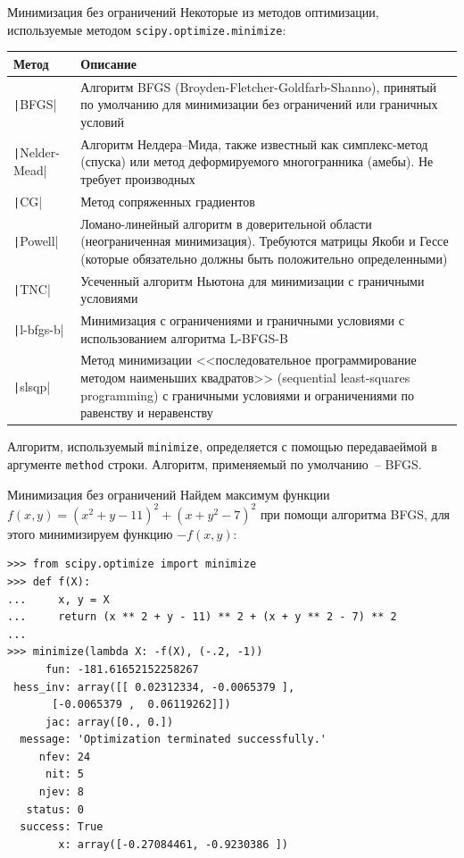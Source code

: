 \documentclass[aspectratio=169, mathserif]{beamer}	%
\begin{document}
\begin{frame}[fragile]{Минимизация без ограничений}
\scriptsize
Некоторые из методов оптимизации, используемые методом \texttt{scipy.optimize.minimize}:
\begin{table}[h!]
\begin{tabular}{|p{}|p{}|}
\hline
\textbf{Метод} & \textbf{Описание} \\
\hline
\texttt|BFGS| & Алгоритм BFGS (Broyden-Fletcher-Goldfarb-Shanno), принятый по умолчанию для минимизации без ограничений или граничных условий \\
\hline
\texttt|Nelder-Mead| & Алгоритм Нелдера–Мида, также известный как симплекс-метод (спуска) или
метод деформируемого многогранника (амебы). Не требует производных \\
\hline
\texttt|CG| & Метод сопряженных градиентов \\
\hline
\texttt|Powell| & Ломано-линейный алгоритм в доверительной области (неограниченная минимизация). Требуются матрицы Якоби и Гессе (которые обязательно должны быть положительно определенными) \\
\hline
\texttt|TNC| & Усеченный алгоритм Ньютона для минимизации с граничными условиями \\
\hline
\texttt|l-bfgs-b| & Минимизация с ограничениями и граничными условиями с использованием алгоритма L-BFGS-B \\
\hline
\texttt|slsqp| & Метод минимизации <<последовательное программирование методом наименьших квадратов>> (sequential least-squares programming) с граничными условиями и ограничениями по равенству и неравенству \\
\hline
\end{tabular}
\end{table}
\vfill
Алгоритм, используемый \texttt{minimize}, определяется с помощью передаваеймой в аргументе \texttt{method} строки. Алгоритм, применяемый по умолчанию~-- BFGS.
\vfill
\end{frame}


\begin{frame}[fragile]{Минимизация без ограничений}
\scriptsize
Найдем максимум функции $f\left(x, y\right) = \left(x^2 + y - 11\right)^2 + \left(x + y^2 - 7\right)^2$ при помощи алгоритма BFGS, для этого минимизируем функцию $-f\left(x, y\right)$:
\vfill
\begin{verbatim}
>>> from scipy.optimize import minimize
>>> def f(X):
...     x, y = X
...     return (x ** 2 + y - 11) ** 2 + (x + y ** 2 - 7) ** 2
...
>>> minimize(lambda X: -f(X), (-.2, -1))
      fun: -181.61652152258267
 hess_inv: array([[ 0.02312334, -0.0065379 ],
       [-0.0065379 ,  0.06119262]])
      jac: array([0., 0.])
  message: 'Optimization terminated successfully.'
     nfev: 24
      nit: 5
     njev: 8
   status: 0
  success: True
        x: array([-0.27084461, -0.9230386 ])
\end{verbatim}
\vfill
\end{frame}
\end{document}
